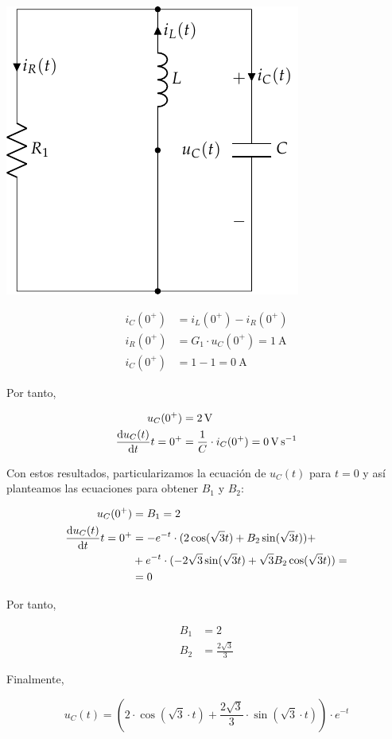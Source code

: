 \documentclass[12pt]{article}
\begin{document}
\begin{minipage}{0.3\textwidth}
  \includegraphics[scale=0.8]{figs/FM_4_9_natural}
\end{minipage}
\begin{minipage}{0.7\textwidth}
  \begin{align*}
    i_C(0^+) &= i_L(0^+) - i_R(0^+)\\
    i_R(0^+) &= G_1 \cdot u_C(0^+) = \SI{1}{\ampere}\\
    i_C(0^+) &= 1 - 1 = \SI{0}{\ampere}
  \end{align*}
\end{minipage}

\bigskip

Por tanto,

\begin{align*}
  u_C(0^+) &= \SI{2}{\volt}\\
  \diff{u_C(t)}{t}{t = 0^+} &= \frac{1}{C} \cdot i_C(0^+) = \SI{0}{\volt\per\second}
\end{align*}

Con estos resultados, particularizamos la ecuación de $u_C(t)$ para
$t = 0$ y así planteamos las ecuaciones para obtener $B_1$ y $B_2$:

\begin{align*}
  u_C(0^+) &= B_1 = 2\\
  \diff{u_C(t)}{t}{t = 0^+} &= -e^{-t} \cdot (2\cos(\sqrt{3}t) + B_2\sin(\sqrt{3}t)) +\\
           &+ e^{-t} \cdot (-2\sqrt{3}\sin(\sqrt{3}t) + \sqrt{3} B_2\cos(\sqrt{3}t)) =\\
           &= 0
\end{align*}

Por tanto,

\begin{align*}
  B_1 &= 2\\
  B_2 &= \frac{2\sqrt{3}}{3}
\end{align*}

Finalmente,

\begin{equation*}
  u_C(t) = (2 \cdot \cos(\sqrt{3} \cdot t) + \frac{2\sqrt{3}}{3} \cdot \sin(\sqrt{3} \cdot t)) \cdot e^{-t}
\end{equation*}


\clearpage
\end{document}
